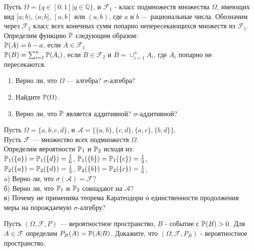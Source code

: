 \begin{problem}
Пусть $\Omega=\{q\in[0;1]|q\in\mathbb{Q}\}$, и $\mathcal{F}_{1}$ -
класс подмножеств множества $\Omega$, имеющих вид $[a;b)$,
$(a;b]$, $[a,b]$ или $(a,b)$, где $a$ и $b$ — рациональные числа.
Обозначим через $\mathcal{F}_{2}$ класс всех конечных сумм попарно
непересекающихся множеств из $\mathcal{F}_{1}$. Определим
функцию $\P$ следующим образом: \\
$\P(A)=b-a$, если $A\in \mathcal{F}_{1}$ \\
$\P(B)=\sum_{i=1}^{n}\P(A_{i})$, если $B\in
\mathcal{F}_{2}$ и $B=\cup_{i=1}^{n}A_{i}$, где $A_{i}$ попарно не
пересекаются.
\begin{enumerate}
\item Верно ли, что $\Omega$ — алгебра? $\sigma$-алгебра?
\item Найдите $\P(\Omega)$.
\item Верно ли, что $\P$ является аддитивной? $\sigma$-аддитивной?
\end{enumerate}

\begin{sol}

\end{sol}
\end{problem}

\begin{problem}
Пусть $\Omega=\{a,b,c,d\}$, и
$\mathcal{A}=\{\{a,b\},\{c,d\},\{a,c\},\{b,d\}\}$. \\
Пусть $\mathcal{F}$ — множество всех подмножеств $\Omega$. \\
Определим вероятности $\P_{1}$ и $\P_{2}$ исходя
из: \\
$\P_{1}(\{a\})=\P_{1}(\{d\})=\frac{1}{6}$,
$\P_{1}(\{b\})=\P_{1}(\{c\})=\frac{1}{3}$, \\
$\P_{2}(\{a\})=\P_{2}(\{d\})=\frac{1}{3}$,
$\P_{2}(\{b\})=\P_{2}(\{c\})=\frac{1}{6}$, \\
a) Верно ли, что $\sigma(\mathcal{A})=\mathcal{F}$? \\
б) Верно ли, что $\P_{1}$ и $\P_{2}$ совпадают на
$\mathcal{A}$? \\
в) Почему не применима теорема Каратеодори о единственности
продолжения меры на порождаемую $\sigma$-алгебру?

\begin{sol}

\end{sol}
\end{problem}

\begin{problem}
Пусть $(\Omega,\mathcal{F},P)$ — вероятностное пространство, $B$ -
событие с $\P(B)>0$. Для $A\in \mathcal{F}$ определим
$P_{B}(A)=\P(A|B)$. Докажите, что $(\Omega,\mathcal{F},P_{B})$ -
вероятностное пространство.

\begin{sol}

\end{sol}
\end{problem}

